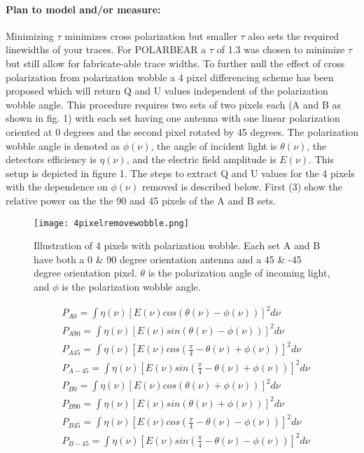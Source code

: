 \paragraph{Plan to model and/or measure:}
Minimizing $\tau$ minimizes cross polarization but smaller $\tau$ also sets the required linewidths of your traces. For POLARBEAR a $\tau$ of 1.3 was chosen to minimize $\tau$ but still allow for fabricate-able trace widths. To further null the effect of cross polarization from polarization wobble a 4 pixel differencing scheme has been proposed which will return Q and U values independent of the polarization wobble angle. This procedure requires two sets of two pixels each (A and B as shown in fig. 1) with each set having one antenna with one linear polarization oriented at 0 degrees and the second pixel rotated by 45 degrees. The polarization wobble angle is denoted as $\phi(\nu)$, the angle of incident light is $\theta(\nu)$, the detectors efficiency is $\eta(\nu)$, and the electric field amplitude is $E(\nu)$. This setup is depicted in figure 1. The steps to extract Q and U values for the 4 pixels with the dependence on $\phi(\nu)$ removed is described below. First (3) show the relative power on the the 90 and 45 pixels of the A and B sets.
\begin{figure}
\centering
\texttt{[image: 4pixelremovewobble.png]}
\caption{Illustration of 4 pixels with polarization wobble. Each set A and B have both a 0 \& 90 degree orientation antenna and a 45 \& -45 degree orientation pixel. $\theta$ is the polarization angle of incoming light, and $\phi$ is the polarization wobble angle.}
\label{4pixelwobbleremoval}
\end{figure}
\begin{equation}
\begin{split}
&P_{A0} = \int \eta(\nu)[E(\nu)cos(\theta(\nu)-\phi(\nu))]^2 d\nu \\
&P_{A90} = \int \eta(\nu)[E(\nu)sin(\theta(\nu)-\phi(\nu))]^2 d\nu \\
&P_{A45} = \int \eta(\nu)[E(\nu)cos(\frac{\pi}{4}-\theta(\nu)+\phi(\nu))]^2 d\nu \\
&P_{A-45} = \int \eta(\nu)[E(\nu)sin(\frac{\pi}{4}-\theta(\nu)+\phi(\nu))]^2 d\nu \\
&P_{B0} = \int \eta(\nu)[E(\nu)cos(\theta(\nu)+\phi(\nu))]^2 d\nu \\
&P_{B90} = \int \eta(\nu)[E(\nu)sin(\theta(\nu)+\phi(\nu))]^2 d\nu \\
&P_{B45} = \int \eta(\nu)[E(\nu)cos(\frac{\pi}{4}-\theta(\nu)-\phi(\nu))]^2 d\nu \\
&P_{B-45} = \int \eta(\nu)[E(\nu)sin(\frac{\pi}{4}-\theta(\nu)-\phi(\nu))]^2 d\nu
\end{split}
\end{equation}
